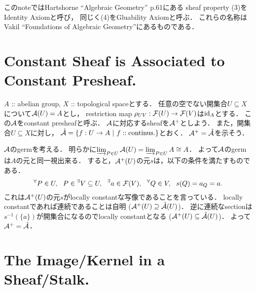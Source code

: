 \documentclass[a4paper]{jsarticle}
\begin{document}
    このnoteではHartshorne ``Algebraic Geometry'' p.61にある
    sheaf property (3)をIdentity Axiomと呼び，
    同じく(4)をGluability Axiomと呼ぶ．
    これらの名称はVakil ``Foundations of Algebraic Geometry''にあるものである．

\section{Constant Sheaf is Associated to Constant Presheaf.} %
    $A$ :: abelian group, $X$ :: topological spaceとする．
    任意の空でない開集合$U \subseteq X$について$\mathcal{A}(U)=A$とし，
    restriction map $\rho_{UV}: \mathcal{F}(U) \to \mathcal{F}(V)$は$\mathrm{id}_{A}$とする．
    この$\mathcal{A}$をconstant presheafと呼ぶ．
    $\mathcal{A}$に対応するsheafを$\mathcal{A}^+$としよう．
    また，開集合$U \subseteq X$に対し，
    $\hat{\mathcal{A}}=\{ f:U \to A ~|~ f :: \text{continus}. \}$とおく．
    $\mathcal{A}^+=\hat{\mathcal{A}}$を示そう．
    
    $\mathcal{A}$のgermを考える．
    明らかに$\varinjlim_{P \in U} \mathcal{A}(U)=\varinjlim_{P \in U} A \cong A$．
    よって$\mathcal{A}$のgermは$A$の元と同一視出来る．
    すると，$\mathcal{A}^+(U)$の元$s$は，以下の条件を満たすものである．
    \[
        {}^{\forall} P \in U,~~ P \in {}^{\exists}V \subseteq U,~~ {}^{\exists} a \in \mathcal{F}(V),~~
        {}^{\forall} Q \in V,~~ s(Q)=a_Q=a.
    \]
    これは$\mathcal{A}^+(U)$の元$s$がlocally constantな写像であることを言っている．
    locally constantであれば連続であることは自明
    ($\mathcal{A}^+(U) \supseteq \hat{\mathcal{A}}(U)$)．
    逆に連続なsectionは$s^{-1}(\{a\})$が開集合になるのでlocally constantとなる
    ($\mathcal{A}^+(U) \subseteq \hat{\mathcal{A}}(U)$)．
    よって$\mathcal{A}^+=\hat{\mathcal{A}}$．

\section{The Image/Kernel in a Sheaf/Stalk.} %
\end{document}
